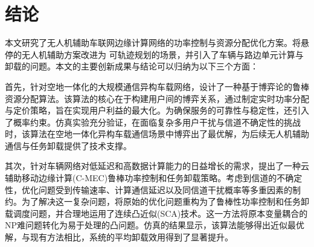 \chapter{结论} \label{chap:equcc}
\begin{comment}
首先，针对空地一体化的大规模通信异构车载网络，提出了一种基于博弈的鲁
棒资源分配算法，该方案以用户间的博弈关系为核心，制定了实时功率分配和定价
策略，在新颖的优化方案中实现了用户利益的最大化。引入了概率约束，以确保用
户服务的可靠性和稳定性。仿真结果表明，所提算法具有复杂多用户干扰和信道不
确定性的空地一体化异构车载通信场景下是有效的。

其次，针对车辆网络越来越高的低延迟高数据计算的需求，提出了云辅助 MEC
的鲁棒功率控制和任务卸载的新方法。由于信道存在不确定性，优化问题受到传输
速率、计算通信延迟和同信道干扰概率形式的限制。最初的优化问题被表述为鲁棒
性功率控制和任务卸载调度问题，应用了 SCA 技术，将变量耦合的 NP 难问题转化
为可处理的凸问题。仿真结果表明，我们提出的算法得到了近似最优解。与现有方
法相比，系统平均卸载效用得到显著改善。

最后，考虑了更加实际的物理场景，将无人机辅助通信与任务卸载相结合，提
出了一种高效的天地一体化的无人机辅助双向车道的车辆通信方案。构建了车辆通
信时的吞吐量与通信及无人机飞行能耗的基本平衡方案。通过优化车辆的发射功率
与无人机的飞行轨迹，以及时隙的分配，可以使得系统的能效最大化，数值仿真表
明，该方案在能效方面的性能明显高于其他方法并可显著提升车联网通信效率。
\end{comment}
本文研究了无人机辅助车联网边缘计算网络的功率控制与资源分配优化方案。将悬停的无人机辅助方案改进为
可轨迹规划的场景，并引入了车辆与路边单元计算与卸载的问题。本文的主要创新成果与结论可以归纳为以下三个方面：

首先，针对空地一体化的大规模通信异构车载网络，设计了一种基于博弈论的鲁棒资源分配算法。该算法的核心在于构建用户间的博弈关系，通过制定实时功率分配与定价策略，旨在实现用户利益的最大化。为确保服务的可靠性与稳定性，还引入了概率约束。仿真实验充分验证，在面临复杂多用户干扰与信道不确定性的挑战时，该算法在空地一体化异构车载通信场景中博弈出了最优解，为后续无人机辅助通信与任务卸载提供了技术支撑。

其次，针对车辆网络对低延迟和高数据计算能力的日益增长的需求，提出了一种云辅助移动边缘计算(C-MEC)鲁棒功率控制和任务卸载策略。考虑到信道的不确定性，优化问题受到传输速率、计算通信延迟以及同信道干扰概率等多重因素的制约。为了解决这一复杂问题，将原始的优化问题重构为了鲁棒性功率控制和任务卸载调度问题，并合理地运用了连续凸近似(SCA)技术。这一方法将原本变量耦合的NP难问题转化为易于处理的凸问题。仿真的结果显示，该算法能够得出近似最优解，与现有方法相比，系统的平均卸载效用得到了显著提升。

